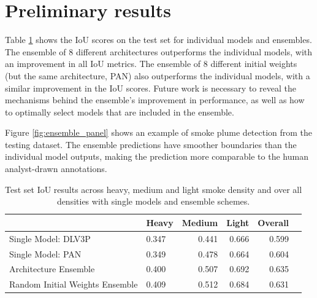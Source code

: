\documentclass{article}
\begin{document}
\section{Preliminary results}
Table \ref{tab:results} shows the IoU scores on the test set for individual models and ensembles. The ensemble of 8 different architectures outperforms the individual models, with an improvement in all IoU metrics. The ensemble of 8 different initial weights (but the same architecture, PAN) also outperforms the individual models, with a similar improvement in the IoU scores. Future work is necessary to reveal the mechanisms behind the ensemble's improvement in performance, as well as how to optimally select models that are included in the ensemble.

Figure \ref{fig:ensemble_panel} shows an example of smoke plume detection from the testing dataset. The ensemble predictions have smoother boundaries than the individual model outputs, making the prediction more comparable to the human analyst-drawn annotations.
\begin{table}[h]
    \centering
    \caption{Test set IoU results across heavy, medium and light smoke density and over all densities with single models and ensemble schemes.}
    \label{tab:results}
    \begin{tabular}{llrrr>{\bfseries}r}
        \hline
            &   Heavy &   Medium &   Light &   Overall \\
        \hline
        Single Model: DLV3P \citep{dlv3p} &   0.347 &     0.441 &  0.666 &      0.599  \\
        Single Model: PAN \citep{PAN} &  0.349 &     0.478 &  0.664 &      0.604 \\
        Architecture Ensemble &   0.400 &     0.507 &  0.692 &      0.635 \\ %
        Random Initial Weights Ensemble &  0.409 &     0.512 &  0.684 &      0.631 \\%
         \hline
    \end{tabular}
    \end{table}
\end{document}
